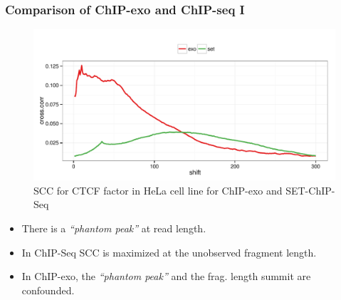 \documentclass[compress,table,xcolor=dvipsnames]{beamer}\usepackage[]{graphicx}\usepackage[]{color}
\begin{document}
\begin{frame}
  \frametitle{Comparison of ChIP-exo and ChIP-seq I}  
\begin{figure}[H]
  \centering  
\includegraphics[width = .7\textwidth]{../figs/for_paper/scc_ctcf.pdf}
\caption{SCC for CTCF factor in HeLa cell line for ChIP-exo and
  SET-ChIP-Seq }
  \label{fig:scc}
\end{figure}

\begin{itemize}
\item There is a \emph{``phantom peak''} at read length.
\item In ChIP-Seq SCC is maximized at the unobserved fragment length.
\item In ChIP-exo, the \emph{``phantom peak''} and the frag. length
  summit are confounded.
\end{itemize}

\end{frame}
\end{document}
